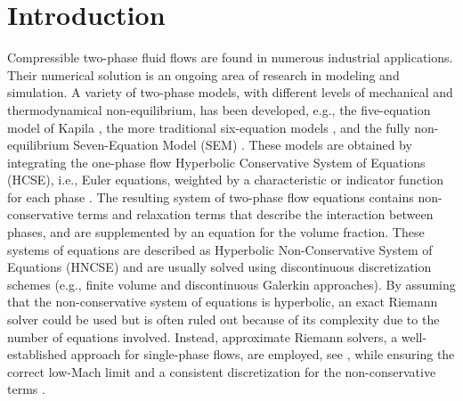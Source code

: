 \section{Introduction}\label{sec:intro}
%
Compressible two-phase fluid flows are found in numerous industrial applications. Their numerical solution is an ongoing area of research 
in modeling and simulation. 
A variety of two-phase models, with different levels of mechanical and thermodynamical non-equilibrium, has been developed, e.g., 
the five-equation model of Kapila \cite{Kapila_2001,GuillardMurrone2003,Saurel_2009}, 
the more traditional six-equation models \cite{Stadtke}, 
and the fully non-equilibrium Seven-Equation Model (SEM) \cite{Berry_1985,BaerNunziato,Saurel_2001b,SEM}. 
These models are obtained by integrating the one-phase flow Hyperbolic Conservative System of Equations (HCSE), 
i.e., Euler equations, weighted by a characteristic or indicator function for each phase \cite{DrewPassman}.
The resulting system of two-phase flow equations contains non-conservative terms and relaxation terms that 
describe the interaction between phases, and are supplemented by an equation for the volume fraction. 
These systems of equations are described as Hyperbolic Non-Conservative System of Equations (HNCSE) 
and are usually solved using discontinuous discretization schemes (e.g., finite volume and discontinuous 
Galerkin approaches). By assuming that the non-conservative system of equations is hyperbolic, an exact Riemann solver 
could be used but is often ruled out because of its complexity due to the number of equations involved. 
Instead, approximate Riemann solvers, a well-established approach for single-phase flows, are employed, 
see \cite{Saurel_2001a,Saurel_2001b,Li_2004,Zein_2010,Ambroso_2012}, while ensuring the correct 
low-Mach limit and a consistent discretization for the non-conservative terms \cite{Li_2004,Abgrall_2002}.

